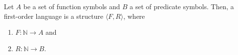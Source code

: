 
\begin{definition}\label{def:fol}
    \leanok
    Let $A$ be a set of function symbols and $B$ a set of predicate symbols. Then, a first-order language is a structure $\langle F, R \rangle$, where 
        \begin{enumerate}
            \item $F : \mathbb{N} \to A$ and
            \item $R : \mathbb{N} \to B$.
        \end{enumerate}

\end{definition}



